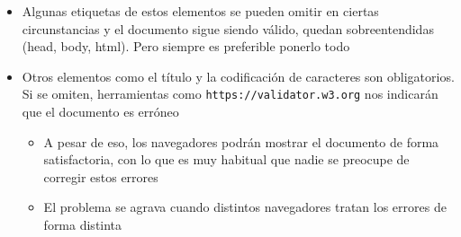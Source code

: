\documentclass[ucs]{beamer}
\begin{document}
\begin{frame}[fragile]
\frametitle{}
\begin{itemize}
\item
Algunas etiquetas de estos elementos se pueden omitir en ciertas circunstancias y el 
documento sigue siendo válido, quedan
sobreentendidas (head, body, html). Pero siempre es preferible ponerlo todo

\item
Otros elementos como el título y la codificación de caracteres son obligatorios.
Si se omiten, herramientas como \verb|https://validator.w3.org| nos indicarán
que el documento es erróneo

    \begin{itemize}
    \item
A pesar de eso, los navegadores podrán mostrar el documento de forma satisfactoria,
con lo que es muy habitual que nadie se preocupe de corregir estos errores
    \item
El problema se agrava cuando distintos navegadores tratan los errores de forma distinta
    \end{itemize}


\end{itemize}

\end{frame}
\end{document}
